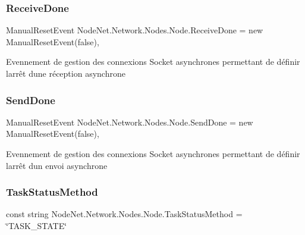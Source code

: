\subsubsection{\texorpdfstring{Receive\+Done}{ReceiveDone}}
{\footnotesize\ttfamily Manual\+Reset\+Event Node\+Net.\+Network.\+Nodes.\+Node.\+Receive\+Done = new Manual\+Reset\+Event(false)\hspace{0.3cm}{\ttfamily [static]}, {\ttfamily [protected]}}



Evennement de gestion des connexions Socket asynchrones permettant de définir l\textquotesingle{}arrêt d\textquotesingle{}une réception asynchrone 

\mbox{\label{class_node_net_1_1_network_1_1_nodes_1_1_node_a5995108151b216b553cf5810f64dc5f2}} 
\subsubsection{\texorpdfstring{Send\+Done}{SendDone}}
{\footnotesize\ttfamily Manual\+Reset\+Event Node\+Net.\+Network.\+Nodes.\+Node.\+Send\+Done = new Manual\+Reset\+Event(false)\hspace{0.3cm}{\ttfamily [static]}, {\ttfamily [protected]}}



Evennement de gestion des connexions Socket asynchrones permettant de définir l\textquotesingle{}arrêt d\textquotesingle{}un envoi asynchrone 

\mbox{\label{class_node_net_1_1_network_1_1_nodes_1_1_node_a5c5ce25d72d61f0a1631461cb04cf004}} 
\subsubsection{\texorpdfstring{Task\+Status\+Method}{TaskStatusMethod}}
{\footnotesize\ttfamily const string Node\+Net.\+Network.\+Nodes.\+Node.\+Task\+Status\+Method = \char`\"{}T\+A\+S\+K\+\_\+\+S\+T\+A\+TE\char`\"{}\hspace{0.3cm}{\ttfamily [protected]}}



